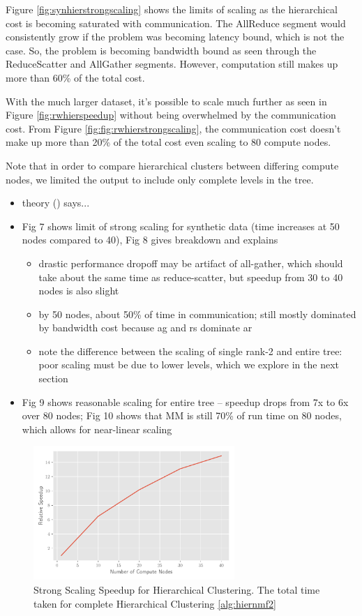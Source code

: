 Figure \ref{fig:synhierstrongscaling} shows the limits of scaling as the hierarchical cost is becoming saturated with communication.
The AllReduce segment would consistently grow if the problem was becoming latency bound, which is not the case.
So, the problem is becoming bandwidth bound as seen through the ReduceScatter and AllGather segments. 
However, computation still makes up more than 60\% of the total cost.

With the much larger \image{} dataset, it's possible to scale much further as seen in Figure \ref{fig:rwhierspeedup} without being overwhelmed by the communication cost.
From Figure \ref{fig:fig:rwhierstrongscaling}, the communication cost doesn't make up more than 20\% of the total cost even scaling to 80 compute nodes. 

Note that in order to compare hierarchical clusters between differing compute nodes, we limited the output to include only complete levels in the tree.

\begin{itemize}
	\item theory () says...
	\item Fig 7 shows limit of strong scaling for synthetic data (time increases at 50 nodes compared to 40), Fig 8 gives breakdown and explains
	\begin{itemize}
		\item drastic performance dropoff may be artifact of all-gather, which should take about the same time as reduce-scatter, but speedup from 30 to 40 nodes is also slight
		\item by 50 nodes, about 50\% of time in communication; still mostly dominated by bandwidth cost because ag and rs dominate ar
		\item note the difference between the scaling of single rank-2 and entire tree: poor scaling must be due to lower levels, which we explore in the next section
	\end{itemize}
	\item Fig 9 shows reasonable scaling for entire tree -- speedup drops from 7x to 6x over 80 nodes; Fig 10 shows that MM is still 70\% of run time on 80 nodes, which allows for near-linear scaling
\end{itemize}

\begin{figure}
\begin{center}
\includegraphics[height=2in, width=\columnwidth]{plots/synthetic_hierarchical_speedup.pdf}
\caption{Strong Scaling Speedup for Hierarchical Clustering. The total time taken for complete Hierarchical Clustering \cref{alg:hiernmf2}}
\label{fig:synhierspeedup}
\end{center}
\end{figure}

